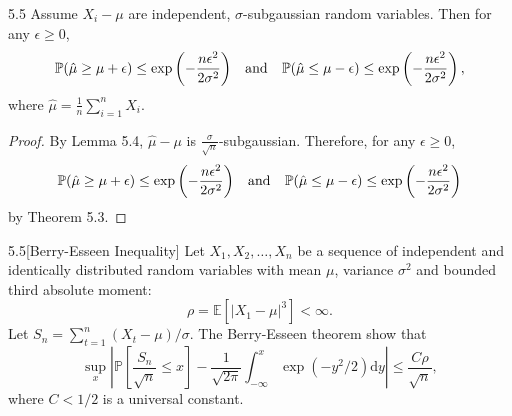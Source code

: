 \documentclass[10pt]{article}
\newenvironment{corollary*}[1]{%
  \IfBlankTF{#1}
    {\renewcommand{\themanualcorollaryinner}{\unskip}}
    {\renewcommand\themanualcorollaryinner{#1}}%
  \manualcorollaryinner
}{\endmanualcorollaryinner}
\theoremstyle{definition}
\newenvironment{exercise*}[1]{%
  \IfBlankTF{#1}
    {\renewcommand{\themanualexerciseinner}{\unskip}}
    {\renewcommand\themanualexerciseinner{#1}}%
  \manualexerciseinner
}{\endmanualexerciseinner}
\begin{document}
\begin{corollary*}{5.5}
    Assume $X_i - \mu$ are independent, $\sigma$-subgaussian random variables.
    Then for any $\epsilon \geq 0$,
    \begin{equation*}
        \mathbb{P}(\hat{\mu} \geq \mu + \epsilon) \leq \exp\left(-\frac{n \epsilon^2}{2 \sigma^2}\right) \hspace{0.5em} \text{ and } \hspace{0.7em} \mathbb{P}(\hat{\mu} \leq \mu - \epsilon) \leq \exp\left(-\frac{n \epsilon^2}{2 \sigma^2}\right),
    \end{equation*}
    where $\hat{\mu} = \frac{1}{n} \sum_{i=1}^n X_i$.
\end{corollary*}

\begin{proof}
    By Lemma 5.4, $\hat{\mu} - \mu$ is $\frac{\sigma}{\sqrt{n}}$-subgaussian. Therefore, for any $\epsilon \geq 0$,
    \begin{equation*}
        \mathbb{P}(\hat{\mu} \geq \mu + \epsilon) \leq \exp\left(-\frac{n \epsilon^2}{2 \sigma^2}\right) \hspace{0.5em} \text{ and } \hspace{0.7em} \mathbb{P}(\hat{\mu} \leq \mu - \epsilon) \leq \exp\left(-\frac{n \epsilon^2}{2 \sigma^2}\right)
    \end{equation*}
    by Theorem 5.3.
\end{proof}

\begin{exercise*}{5.5}[Berry-Esseen Inequality]
    Let $X_1, X_2, \ldots, X_n$ be a sequence of independent and identically distributed random variables with mean $\mu$, variance $\sigma^2$ and bounded third absolute moment:
    \begin{equation*}
        \rho = \mathbb{E} \left[ |X_1 - \mu|^3 \right] < \infty.
    \end{equation*}
    Let $S_n = \sum_{t=1}^n (X_t - \mu)/\sigma$. The Berry-Esseen theorem show that
    \begin{equation*}
        \sup_x \left| \mathbb{P} \left[ \frac{S_n}{\sqrt{n}} \leq x \right] - \frac{1}{\sqrt{2\pi}} \int_{-\infty}^x \exp(-y^2 /2) \text{d} y\right| \leq \frac{C \rho}{\sqrt{n}},
    \end{equation*}
    where $C < 1/2$ is a universal constant.
\end{exercise*}
\end{document}
